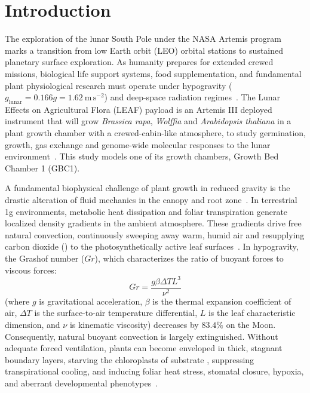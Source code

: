 \documentclass[pdflatex,sn-nature,iicol]{sn-jnl}
\begin{document}
\maketitle

\section{Introduction}\label{sec:intro}

The exploration of the lunar South Pole under the NASA Artemis program marks a transition from low Earth orbit (LEO) orbital stations to sustained planetary surface exploration. As humanity prepares for extended crewed missions, biological life support systems, food supplementation, and fundamental plant physiological research must operate under hypogravity ($g_{\mathrm{lunar}} = 0.166g = 1.62\ \mathrm{m\,s^{-2}}$) and deep-space radiation regimes~\cite{jeseritz2025leaf,paul2013fundamental}. The Lunar Effects on Agricultural Flora (LEAF) payload is an Artemis III deployed instrument that will grow \textit{Brassica rapa}, \textit{Wolffia} and \textit{Arabidopsis thaliana} in a plant growth chamber with a crewed-cabin-like atmosphere, to study germination, growth, gas exchange and genome-wide molecular responses to the lunar environment~\cite{jeseritz2025leaf}. This study models one of its growth chambers, Growth Bed Chamber 1 (GBC1).

A fundamental biophysical challenge of plant growth in reduced gravity is the drastic alteration of fluid mechanics in the canopy and root zone~\cite{porterfield2002biophysical,kitaya2001gravity}. In terrestrial 1g environments, metabolic heat dissipation and foliar transpiration generate localized density gradients in the ambient atmosphere. These gradients drive free natural convection, continuously sweeping away warm, humid air and resupplying carbon dioxide () to the photosynthetically active leaf surfaces~\cite{farquhar1980biochemical,kitaya2001gravity,kitaya2003air}. In hypogravity, the Grashof number ($Gr$), which characterizes the ratio of buoyant forces to viscous forces:
\begin{equation}
Gr = \frac{g \beta \Delta T L^3}{\nu^2}
\label{eq:grashof}
\end{equation}
(where $g$ is gravitational acceleration, $\beta$ is the thermal expansion coefficient of air, $\Delta T$ is the surface-to-air temperature differential, $L$ is the leaf characteristic dimension, and $\nu$ is kinematic viscosity) decreases by $83.4\%$ on the Moon. Consequently, natural buoyant convection is largely extinguished. Without adequate forced ventilation, plants can become enveloped in thick, stagnant boundary layers, starving the chloroplasts of substrate , suppressing transpirational cooling, and inducing foliar heat stress, stomatal closure, hypoxia, and aberrant developmental phenotypes~\cite{porterfield2002biophysical,musgrave1998changes,kitaya2001gravity}.
\end{document}
